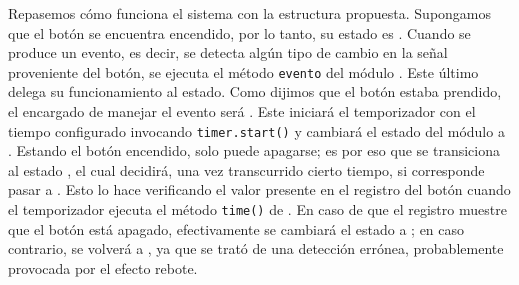 \begin{figure}[H]
\begin{center}
{
}
\end{center}
\end{figure}


Repasemos cómo funciona el sistema con la estructura propuesta. Supongamos que el botón se encuentra encendido, por lo tanto, su estado es \On. Cuando se produce un evento, es decir, se detecta algún tipo de cambio en la señal proveniente del botón, se ejecuta el método \verb|evento| del módulo \Boton. Este último delega su funcionamiento al estado. Como dijimos que el botón estaba prendido, el encargado de manejar el evento será \On. Este iniciará el temporizador con el tiempo configurado invocando \verb|timer.start()| y cambiará el estado del módulo \Boton a \OffWait. Estando el botón encendido, solo puede apagarse; es por eso que se transiciona al estado \OffWait, el cual decidirá, una vez transcurrido cierto tiempo, si corresponde pasar a \Off. Esto lo hace verificando el valor presente en el registro del botón cuando el temporizador ejecuta el método \verb|time()| de \Boton. En caso de que el registro muestre que el botón está apagado, efectivamente se cambiará el estado a \Off; en caso contrario, se volverá a \On, ya que se trató de una detección errónea, probablemente provocada por el efecto rebote. 

